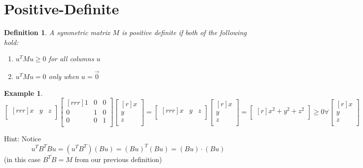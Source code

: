 \documentclass{report}
\newtheorem*{ex}{Example}
\newtheorem*{defn}{Definition}
\begin{document}
\section{Positive-Definite}
\begin{defn}
A symmetric matrix $M$ is positive definite if both of the following hold:
\begin{enumerate}
\item[i.] $u^TMu \geq 0$ for all columns $u$
\item[ii.] $u^TMu=0$ only when $u=\vec{0}$
\end{enumerate}
\end{defn}
\begin{ex}
\[ \begin{bmatrix}[rrr]x&y&z\\\end{bmatrix}\begin{bmatrix}[rrr]1&0&0\\0&1&0\\0&0&1\\\end{bmatrix}\begin{bmatrix}[r]x\\y\\z\\\end{bmatrix}
 = \begin{bmatrix}[rrr]x&y&z\\\end{bmatrix}\begin{bmatrix}[r]x\\y\\z\\\end{bmatrix} = \begin{bmatrix}[r]x^2+y^2+z^2\\\end{bmatrix} \geq 0 \forall \begin{bmatrix}[r]x\\y\\z\\\end{bmatrix} \]
\end{ex}
Hint: Notice 
\[ u^TB^TBu = (u^TB^T)(Bu) = (Bu)^T(Bu)=(Bu)\cdot (Bu) \]
 (in this case $B^TB=M$ from our previous definition) 
\end{document}
